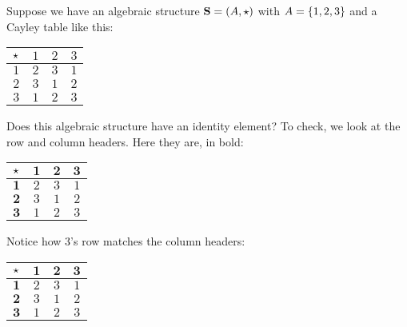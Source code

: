 \documentclass[../../../main.tex]{subfiles}
\begin{document}
\begin{example}

Suppose we have an algebraic structure $\algebra{S} = (\set{A}, \opSymbol/)$ with $A = \{ 1, 2, 3 \}$ and a Cayley table like this:

\begin{center}
  \begin{tabular}{| c || c | c | c | }
    \hline
    $\opSymbol/$ & $1$ & $2$ & $3$ \\ \hline \hline
    $1$          & $2$ & $3$ & $1$ \\ \hline
    $2$          & $3$ & $1$ & $2$ \\ \hline
    $3$          & $1$ & $2$ & $3$ \\ \hline
  \end{tabular}
\end{center}

Does this algebraic structure have an identity element? To check, we look at the row and column headers. Here they are, in bold:

\begin{center}
  \begin{tabular}{| c || c | c | c | }
    \hline
    $\opSymbol/$ & $\mathbf{1}$ & $\mathbf{2}$ & $\mathbf{3}$ \\ \hline \hline
    $\mathbf{1}$          & $2$ & $3$ & $1$ \\ \hline
    $\mathbf{2}$          & $3$ & $1$ & $2$ \\ \hline
    $\mathbf{3}$          & $1$ & $2$ & $3$ \\ \hline
  \end{tabular}
\end{center}

\begin{aside}
  \begin{remark}
Notice how $3$'s row matches the column headers:

\begin{center}
  \begin{tabular}{| c || c | c | c | }
    \hline
    $\opSymbol/$ & \cellcolor{grey3} $\mathbf{1}$ & \cellcolor{grey3} $\mathbf{2}$ & \cellcolor{grey3} $\mathbf{3}$ \\ \hline \hline
    $\mathbf{1}$          & $2$ & $3$ & $1$ \\ \hline
    $\mathbf{2}$          & $3$ & $1$ & $2$ \\ \hline
    $\mathbf{3}$          & \cellcolor{grey3} $1$ & \cellcolor{grey3} $2$ & \cellcolor{grey3} $3$ \\ \hline
  \end{tabular}
\end{center}


\end{remark}
\end{aside}
\end{example}
\end{document}
